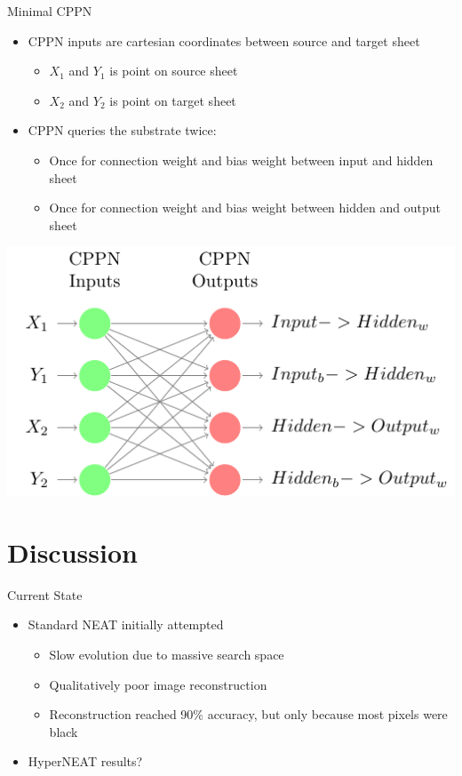\documentclass[xcolor=dvipsnames]{beamer}
\newcommand\Fontvi{\fontsize{7}{10}\selectfont}
\begin{document}
	\begin{frame}{Minimal CPPN}
		\begin{itemize}
			\item CPPN inputs are cartesian coordinates between source and target sheet
			\begin{itemize}\Fontvi
				\item $X_1$ and $Y_1$ is point on source sheet
				\item $X_2$ and $Y_2$ is point on target sheet
			\end{itemize}
			\item CPPN queries the substrate twice:
			\begin{itemize}\Fontvi
				\item Once for connection weight and bias weight between input and hidden sheet
				\item Once for connection weight and bias weight between hidden and output sheet
			\end{itemize}
		\end{itemize}
		\begin{center}
			\includegraphics[width=\textwidth,height=0.4\textheight,keepaspectratio]{MinimalCppn/MinimalCppn}
		\end{center}
	\end{frame}
	
	\section{Discussion}
	\begin{frame}{Current State}
		\begin{itemize}
			\item Standard NEAT initially attempted
			\begin{itemize}
				\item Slow evolution due to massive search space
				\item Qualitatively poor image reconstruction
				\item Reconstruction reached 90\% accuracy, but only because most pixels were black
			\end{itemize}
			\item HyperNEAT results?
		\end{itemize}
	\end{frame}
\end{document}
